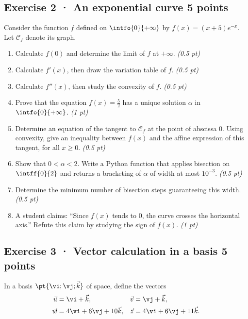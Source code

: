 \subsection*{Exercise 2 · An exponential curve \hfill 5 points}Consider the function $f$ defined on $\intfo{0}{+\infty}$ by $f(x)=(x+5)e^{-x}$. Let $\mathcal C_f$ denote its graph.

\begin{enumerate}

\item Calculate $f(0)$ and determine the limit of $f$ at $+\infty$. \hfill\textit{(0.5 pt)}

\item Calculate $f' (x)$, then draw the variation table of $f$. \hfill\textit{(0.5 pt)}

\item Calculate $f'' (x)$, then study the convexity of $f$. \hfill\textit{(0.5 pt)}

\item Prove that the equation $f(x)=\frac{5}{2}$ has a unique solution $\alpha$ in $\intfo{0}{+\infty}$. \hfill\textit{(1 pt)}

\item Determine an equation of the tangent to $\mathcal C_f$ at the point of abscissa $0$. Using convexity, give an inequality between $f(x)$ and the affine expression of this tangent, for all $x\ge0$. \hfill\textit{(0.5 pt)}

\item Show that $0<\alpha<2$. Write a Python function that applies bisection on $\intff{0}{2}$ and returns a bracketing of $\alpha$ of width at most $10^{-3}$. \hfill\textit{(0.5 pt)}

\item Determine the minimum number of bisection steps guaranteeing this width. \hfill\textit{(0.5 pt)}

\item A student claims: ``Since $f(x)$ tends to $0$, the curve crosses the horizontal axis.'' Refute this claim by studying the sign of $f(x)$. \hfill\textit{(1 pt)}

\end{enumerate}

\mxnewpage{}

\subsection*{Exercise 3 · Vector calculation in a basis \hfill 5 points}In a basis $\pt{\vi;\vj;\vec k}$ of space, define the vectors
\[\begin{aligned}\vec u&=\vi+\vec k,&\vec v&=\vj+\vec k,\\
\vec w&=4\vi+6\vj+10\vec k,&\vec z&=4\vi+6\vj+11\vec k.\end{aligned}\]

